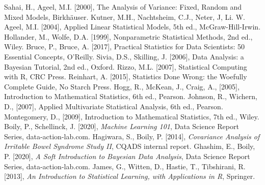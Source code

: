 \newpage{}
\begin{thebibliography}{99}
 Sahai, H., Ageel, M.I. [2000], The Analysis of Variance: Fixed, Random and Mixed Models, Birkh\"auser.
 Kutner, M.H., Nachtsheim, C.J., Neter, J, Li. W. Ageel, M.I. [2004], Applied Linear Statistical Models, 5th ed., McGraw-Hill-Irwin. 
 Hollander, M., Wolfe, D.A. [1999], Nonparametric Statistical Methods, 2nd ed., Wiley.
 Bruce, P., Bruce, A. [2017], Practical Statistics for Data Scientists: 50 Essential Concepts, O'Reilly. 
 Sivia, D.S., Skilling, J. [2006], Data Analysis: a Bayesian Tutorial, 2nd ed., Oxford. 
 Rizzo, M.L. [2007], Statistical Computing with R, CRC Press.
 Reinhart, A. [2015], Statistics Done Wrong: the Woefully Complete Guide, No Starch Press. 
 Hogg, R., McKean, J., Craig, A., [2005], Introduction to Mathematical Statistics, 6th ed., Pearson. 
 Johnson, R., Wichern, D., [2007], Applied Multivariate Statistical Analysis, 6th ed., Pearson. 
 Montegomery, D., [2009], Introduction to Mathematical Statistics, 7th ed., Wiley.
 
 
 Boily, P., Schellinck, J. [2020], \textit{Machine Learning 101}, Data Science Report Series, data-action-lab.com.
 Hagiwara, S., Boily, P. [2014], \textit{Covariance Analysis of Irritable Bowel Syndrome Study II},  CQADS internal report. 
 Ghashim, E., Boily, P. [2020], \textit{A Soft Introduction to Bayesian Data Analysis}, Data Science Report Series, data-action-lab.com.
 James, G., Witten, D., Hastie, T., Tibshirani, R. [2013], \textit{An Introduction to Statistical Learning, with Applications in R}, Springer. 
 
\end{thebibliography}